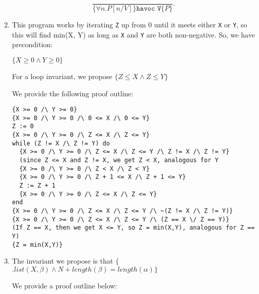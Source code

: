 \begin{enumerate}[label=(\alph*)]
     \[
       \frac{}{\{\forall n. P[n / V]\}\texttt{havoc V}\{P\}}
     .\] 

   \item
     This program works by iterating \texttt{Z} up from 0 until it meets either \texttt{X} or \texttt{Y}, so this will find min(X, Y) as long as \texttt{X} and \texttt{Y} are both non-negative. So, we have precondition:

     $\{X \geq 0 \wedge Y \geq 0\}$

     For a loop invariant, we propose $\{Z \leq X \wedge Z \leq Y\}$

     We provide the following proof outline:

\begin{verbatim}
{X >= 0 /\ Y >= 0}
{X >= 0 /\ Y >= 0 /\ 0 <= X /\ 0 <= Y}
Z := 0
{X >= 0 /\ Y >= 0 /\ Z <= X /\ Z <= Y}
while (Z != X /\ Z != Y) do
  {X >= 0 /\ Y >= 0 /\ Z <= X /\ Z <= Y /\ Z != X /\ Z != Y}
  (since Z <= X and Z != X, we get Z < X, analogous for Y
  {X >= 0 /\ Y >= 0 /\ Z < X /\ Z < Y}
  {X >= 0 /\ Y >= 0 /\ Z + 1 <= X /\ Z + 1 <= Y}
  Z := Z + 1
  {X >= 0 /\ Y >= 0 /\ Z <= X /\ Z <= Y}
end
{X >= 0 /\ Y >= 0 /\ Z <= X /\ Z <= Y /\ ~(Z != X /\ Z != Y)}
{X >= 0 /\ Y >= 0 /\ Z <= X /\ Z <= Y /\ (Z == X \/ Z == Y)}
(If Z == X, then we get X <= Y, so Z = min(X,Y), analogous for Z == Y)
{Z = min(X,Y)}
\end{verbatim}

\item
  The invariant we propose is that $\{$\exists \beta$. list(X, \beta) \wedge N + length(\beta) = length(\alpha)\}$

  We provide a proof outline below:


\end{enumerate}
